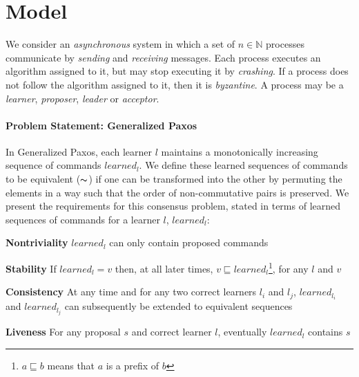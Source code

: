 \section{Model}
\label{sec:model}
%
We consider an \emph{asynchronous} system in which
a set of $n \in \mathbb{N}$ processes communicate by 
\emph{sending} and \emph{receiving} messages.
Each process executes an algorithm assigned to it, but may stop executing it by \emph{crashing}.
If a process does not follow the algorithm assigned to it, then it is \emph{byzantine}.
A process may be a \emph{learner}, \emph{proposer}, \emph{leader} or \emph{acceptor}.

\paragraph{Problem Statement: Generalized Paxos}
In Generalized Paxos, each learner $l$ maintains a monotonically increasing sequence of commands $learned_l$. 
We define these learned sequences of commands to be equivalent ($\thicksim$) 
if one can be transformed into the other by permuting the elements in a way such that the order of non-commutative pairs is preserved. 
We present the requirements for this consensus problem, stated in terms of learned sequences of commands for a learner $l$, $learned_l$:\par
\textbf{Nontriviality} $learned_l$ can only contain proposed commands \par
\textbf{Stability} If $learned_l = v$ then, at all later times, $v \sqsubseteq learned_l$\footnote{$a \sqsubseteq b$ means that $a$ is a prefix of $b$}, for any $l$ and $v$ \par
\textbf{Consistency} At any time and for any two correct learners $l_i$ and $l_j$, $learned_{l_i}$ and $learned_{l_j}$ can subsequently be extended to equivalent sequences\par
\textbf{Liveness} For any proposal $s$ and correct learner $l$, eventually $learned_l$ contains $s$\par

